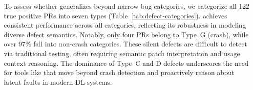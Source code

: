
To assess whether \appname generalizes beyond narrow bug categories, we categorize all 122 true positive PRs into seven types (Table~\ref{tab:defect-categories}).
\appname achieves consistent performance across all categories, reflecting its robustness in modeling diverse defect semantics.
Notably, only four PRs belong to Type~G (crash), while over 97\% fall into non-crash categories.
These silent defects are difficult to detect via traditional testing, often requiring semantic patch interpretation and usage context reasoning.
The dominance of Type~C and D defects underscores the need for tools like \appname that move beyond crash detection and proactively reason about latent faults in modern DL systems.


